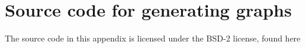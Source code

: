 \chapter{Source code for generating graphs}
\label{apA-graphs}

The source code in this appendix is licensed under the BSD-2 license, found here


